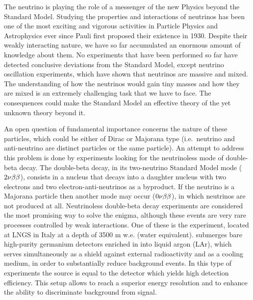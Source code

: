 	The neutrino is playing the role of a messenger of the new Physics beyond the Standard Model. Studying the properties and interactions of neutrinos has been one of the most exciting and vigorous activities in Particle Physics and Astrophysics ever since Pauli first proposed their existence in 1930. Despite their weakly interacting nature, we have so far accumulated an enormous amount of knowledge about them. No experiments that have been performed so far have detected conclusive deviations from the Standard Model, except neutrino oscillation experiments, which have shown that neutrinos are massive and mixed. The understanding of how the neutrinos would gain tiny masses and how they are mixed is an extremely challenging task that we have to face. The consequences could make the Standard Model an effective theory of the yet unknown theory beyond it.

	An open question of fundamental importance concerns the nature of these particles, which could be either of Dirac or Majorana type (i.e.~neutrino and anti-neutrino are distinct particles or the same particle). An attempt to address this problem is done by experiments looking for the neutrinoless mode of double-beta decay. The double-beta decay, in its two-neutrino Standard Model mode ($2\nu\beta\beta$), consists in a nucleus that decays into a daughter nucleus with two electrons and two electron-anti-neutrinos as a byproduct. If the neutrino is a Majorana particle then another mode may occur ($0\nu\beta\beta$), in which neutrinos are not produced at all. Neutrinoless double-beta decay experiments are considered the most promising way to solve the enigma, although these events are very rare processes controlled by weak interactions. One of these is the {\gerda} experiment, located at LNGS in Italy at a depth of 3500 m w.e. (water equivalent). {\gerda} submerges bare high-purity germanium detectors enriched in  into liquid argon (LAr), which serves simultaneously as a shield against external radioactivity and as a cooling medium, in order to substantially reduce background events. In this type of experiments the source is equal to the detector which yields high detection efficiency. This setup allows to reach a superior energy resolution and to enhance the ability to discriminate background from signal.


